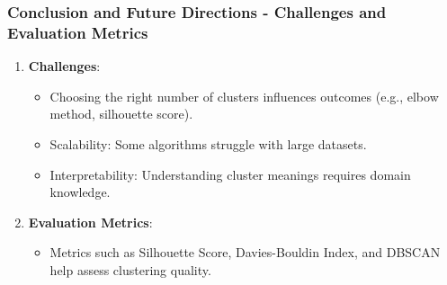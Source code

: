 \documentclass[aspectratio=169]{beamer}
\begin{document}
\begin{frame}[fragile]
    \frametitle{Conclusion and Future Directions - Challenges and Evaluation Metrics}
    \begin{enumerate}
        \item \textbf{Challenges}:
        \begin{itemize}
            \item Choosing the right number of clusters influences outcomes (e.g., elbow method, silhouette score).
            \item Scalability: Some algorithms struggle with large datasets.
            \item Interpretability: Understanding cluster meanings requires domain knowledge.
        \end{itemize}
        
        \item \textbf{Evaluation Metrics}:
        \begin{itemize}
            \item Metrics such as Silhouette Score, Davies-Bouldin Index, and DBSCAN help assess clustering quality.
        \end{itemize}
    \end{enumerate}
\end{frame}
\end{document}

